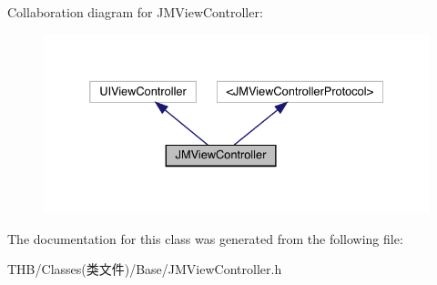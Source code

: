 Collaboration diagram for J\+M\+View\+Controller\+:\nopagebreak
\begin{figure}[H]
\begin{center}
\leavevmode
\includegraphics[width=332pt]{interface_j_m_view_controller__coll__graph}
\end{center}
\end{figure}


The documentation for this class was generated from the following file\+:\begin{DoxyCompactItemize}
\item 
T\+H\+B/\+Classes(类文件)/\+Base/J\+M\+View\+Controller.\+h\end{DoxyCompactItemize}
